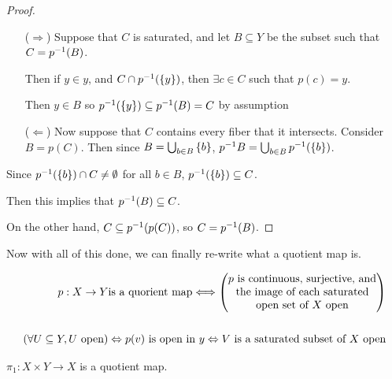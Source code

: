 \documentclass[12pt, twosided]{article}
\begin{document}
\begin{proof}
  \begin{enumerate}
  \item [(\(\Rightarrow\))]Suppose that \(C\) is saturated, and let \(B \subseteq Y\) be the subset such that \(C =  p^{-1}(B)\).

    Then if \(y \in y\), and \(C \cap p^{-1}(\left\{ y\right\})\), then \(\exists c \in C\) such that \(p(c) = y\).

    Then \(y \in B\) so \(p^{-1}(\left\{ y \right\}) \subseteq p^{-1}(B) = C\) by assumption \partdone
  \item [(\(\Leftarrow\))] Now suppose that \(C\) contains every fiber that it intersects. Consider \(B = p(C)\). Then since \(B = \bigcup_{b \in B} \left\{ b \right\}\), \(p^{-1} B = \bigcup_{b \in B} p^{-1}(\left\{ b \right\})\).
  \end{enumerate}

  Since \(p^{-1}(\left\{ b \right\}) \cap C \neq \emptyset\)  for all \(b \in B\), \(p^{-1}(\left\{ b \right\}) \subseteq C\).

  Then this implies that \(p^{-1}(B) \subseteq C\).

  On the other hand, \(C \subseteq p^{-1}(p(C))\), so \(C = p^{-1}(B)\).
\end{proof}

Now with all of this done, we can finally re-write what a quotient map is.

\begin{align*}
p: X \to Y \text{is a quorient map} \Longleftrightarrow
  \begin{pmatrix}
    p \text{ is continuous, surjective, and} \\ \text{the image of each saturated} \\ \text{open set of } X \text{ open}
  \end{pmatrix} \\
  \hspace{1em}\\
  \left(\forall U \subseteq Y, U\text{ open} \right) \Leftrightarrow p(v) \text{ is open in } y \Leftrightarrow V \text{ is a saturated subset of } X \text{ open}
\end{align*}

\begin{exa}
  \(\pi_1: X \times Y \to X\) is a quotient map.
\end{exa}
\end{document}
